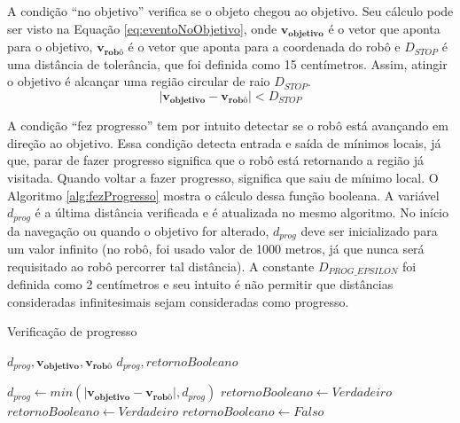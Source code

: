 		
		
		A condição ``no objetivo'' verifica se o objeto chegou ao objetivo. Seu cálculo pode
		ser visto na Equação \ref{eq:eventoNoObjetivo}, onde $\mathbf{v_{objetivo}}$ é o vetor 
		que aponta para o objetivo, $\mathbf{v_{\text{robô}}}$ é o vetor que aponta para a coordenada 
		do robô e $D_{STOP}$ é uma distância de tolerância, que foi definida como 15 centímetros. 
		Assim, atingir o objetivo é alcançar uma região circular de raio $D_{STOP}$.
		\begin{equation}
			\label{eq:eventoNoObjetivo}
			\mid \mathbf{v_{\text{objetivo}}} - \mathbf{v_{\text{robô}}} \mid < D_{STOP}
		\end{equation}
		
		A condição ``fez progresso'' tem por intuito detectar se o robô está avançando em 
		direção ao objetivo. Essa condição detecta entrada e saída de mínimos locais, já que, 
		parar de fazer progresso significa que o robô está retornando a região já visitada. Quando
		voltar a fazer progresso, significa que saiu de mínimo local. O Algoritmo 
		\ref{alg:fezProgresso} mostra o cálculo dessa função booleana. A variável $d_{prog}$ é a última distância 
		verificada e é atualizada no mesmo algoritmo. No início da navegação ou quando o objetivo
		for alterado, $d_{prog}$ deve ser inicializado para um valor infinito (no robô, foi usado 
		valor de 1000 metros, já que nunca será requisitado ao robô percorrer tal distância). A 
		constante $D_{PROG\_EPSILON}$ foi definida como 2 centímetros e seu intuito é não permitir
		que distâncias consideradas infinitesimais sejam consideradas como progresso.
		\begin{algorithm}
		\caption{Verificação de progresso}
		\label{alg:fezProgresso}%
		\begin{algorithmic}[1]
	
		\REQUIRE $d_{prog}, \mathbf{v_{\text{objetivo}}}, \mathbf{v_{\text{robô}}}$
		\ENSURE $d_{prog}, retornoBooleano$
	
			\STATE $d_{prog} \leftarrow min(\mid \mathbf{v_{\text{objetivo}}} - \mathbf{v_{\text{robô}}} \mid, d_{prog})$
			\STATE $retornoBooleano \leftarrow Verdadeiro$
			\STATE $retornoBooleano \leftarrow Verdadeiro$
		\ELSE
			\STATE $retornoBooleano \leftarrow Falso$ 
		\ENDIF
	
		\end{algorithmic}
		\end{algorithm}
	

